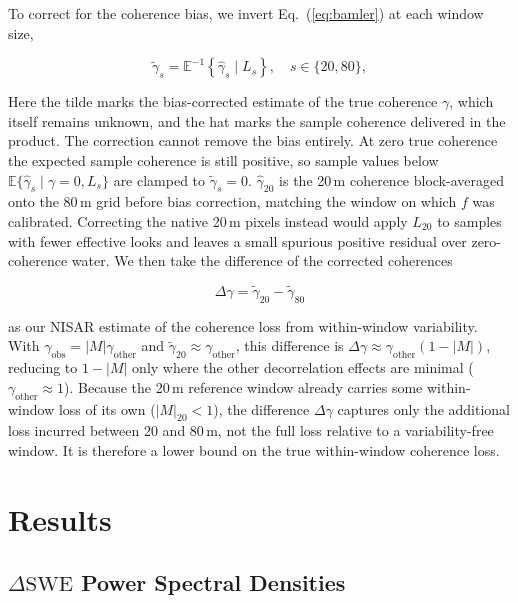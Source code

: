 \documentclass[tc, manuscript]{copernicus}
\begin{document}
To correct for the coherence bias, we invert Eq.~(\ref{eq:bamler}) at each window size,

  \begin{equation}
    \tilde{\gamma}_{s} = \mathbb{E}^{-1}\!\left\{\hat{\gamma}_{s}\mid L_{s}\right\},
    \quad s\in\{20,80\},
    \label{eq:debias}
  \end{equation}

\noindent Here the tilde marks the bias-corrected estimate of the true coherence $\gamma$, which itself remains unknown, and the hat marks the sample coherence delivered in the product. The correction cannot remove the bias entirely. At zero true coherence the expected sample coherence is still positive, so sample values below $\mathbb{E}\{\hat{\gamma}_s \mid \gamma=0, L_s\}$ are clamped to $\tilde{\gamma}_s = 0$. $\hat{\gamma}_{20}$ is the 20\,\unit{m} coherence block-averaged onto the 80\,\unit{m} grid before bias correction, matching the window on which $f$ was calibrated. Correcting the native 20\,\unit{m} pixels instead would apply $L_{20}$ to samples with fewer effective looks and leaves a small spurious positive residual over zero-coherence water. We then take the difference of the corrected coherences

  \begin{equation}
    \Delta\gamma = \tilde{\gamma}_{20} - \tilde{\gamma}_{80}
    \label{eq:cohdiff}
  \end{equation}

\noindent as our NISAR estimate of the coherence loss from within-window variability. With $\gamma_\mathrm{obs}=|M| \gamma_\mathrm{other}$ and $\tilde\gamma_{20}\approx\gamma_\mathrm{other}$, this difference is $\Delta\gamma \approx \gamma_\mathrm{other}(1-|M|)$, reducing to $1-|M|$ only where the other decorrelation effects are minimal ($\gamma_\mathrm{other} \approx 1$). Because the 20\,\unit{m} reference window already carries some within-window loss of its own ($|M|_{20}<1$), the difference $\Delta\gamma$ captures only the additional loss incurred between 20 and 80\,\unit{m}, not the full loss relative to a variability-free window. It is therefore a lower bound on the true within-window coherence loss.

\section{Results}\label{sec:results}

\subsection{$\Delta\mathrm{SWE}$ Power Spectral Densities}\label{subsec:power_spectral_densities}
\end{document}
